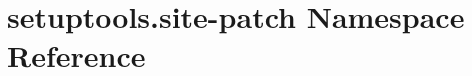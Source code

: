 \hypertarget{namespacesetuptools_1_1site-patch}{}\section{setuptools.\+site-\/patch Namespace Reference}
\label{namespacesetuptools_1_1site-patch}
